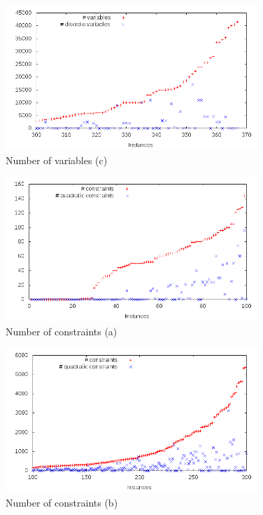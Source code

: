 \begin{figure}\centering
  \includegraphics[width=0.85\textwidth]{pic_var_big.png}
  \caption{Number of variables (c) \label{fig:pic_var_large}}
\end{figure}

\begin{figure}\centering
  \includegraphics[width=0.85\textwidth]{pic_constr_small.png}
  \caption{Number of constraints (a) \label{fig:pic_constr_small}}
\end{figure}

\begin{figure}\centering
  \includegraphics[width=0.85\textwidth]{pic_constr_medium.png}
  \caption{Number of constraints (b) \label{fig:pic_constr_medium}}
\end{figure}

